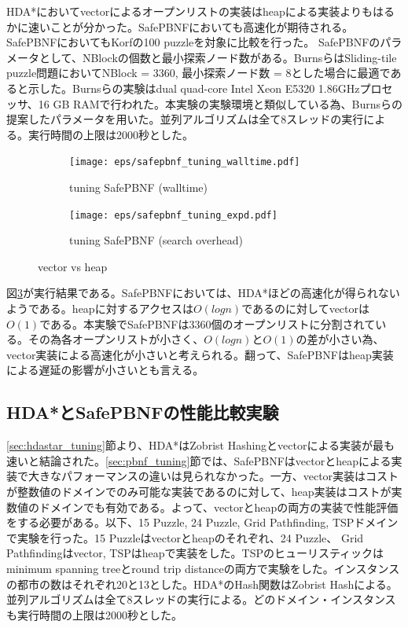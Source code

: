 \documentclass{jsarticle}
\begin{document}
HDA*においてvectorによるオープンリストの実装はheapによる実装よりもはるかに速いことが分かった。SafePBNFにおいても高速化が期待される。SafePBNFにおいてもKorfの100 puzzleを対象に比較を行った。
SafePBNFのパラメータとして、NBlockの個数と最小探索ノード数がある。BurnsらはSliding-tile puzzle問題においてNBlock = 3360, 最小探索ノード数 = 8とした場合に最適であると示した。Burnsらの実験はdual quad-core Intel Xeon E5320 1.86GHzプロセッサ、16 GB RAMで行われた。本実験の実験環境と類似している為、Burnsらの提案したパラメータを用いた。並列アルゴリズムは全て8スレッドの実行による。実行時間の上限は2000秒とした。


\begin{figure}
	\centering
	\begin{subfigure}{0.4\columnwidth}
		\texttt{[image: eps/safepbnf\_tuning\_walltime.pdf]}
		\caption{tuning SafePBNF (walltime)}
		\label{fig:safepbnf_tuning_walltime}
	\end{subfigure}
	\begin{subfigure}{0.4\columnwidth}
		\texttt{[image: eps/safepbnf\_tuning\_expd.pdf]}
		\caption{tuning SafePBNF (search overhead)}
		\label{fig:safepbnf_tuning_expd}
	\end{subfigure}
	\label{fig:safepbnf_tuning}
	\caption{vector vs heap}
\end{figure}

図\ref{fig:safepbnf_tuning}が実行結果である。SafePBNFにおいては、HDA*ほどの高速化が得られないようである。heapに対するアクセスは$O(logn)$であるのに対してvectorは$O(1)$である。本実験でSafePBNFは3360個のオープンリストに分割されている。その為各オープンリストが小さく、$O(logn)$と$O(1)$の差が小さい為、vector実装による高速化が小さいと考えられる。翻って、SafePBNFはheap実装による遅延の影響が小さいとも言える。

\subsection{HDA*とSafePBNFの性能比較実験}

\ref{sec:hdastar_tuning}節より、HDA*はZobrist Hashingとvectorによる実装が最も速いと結論された。\ref{sec:pbnf_tuning}節では、SafePBNFはvectorとheapによる実装で大きなパフォーマンスの違いは見られなかった。一方、vector実装はコストが整数値のドメインでのみ可能な実装であるのに対して、heap実装はコストが実数値のドメインでも有効である。よって、vectorとheapの両方の実装で性能評価をする必要がある。以下、15 Puzzle, 24 Puzzle, Grid Pathfinding, TSPドメインで実験を行った。15 Puzzleはvectorとheapのそれぞれ、24 Puzzle、 Grid Pathfindingはvector, TSPはheapで実装をした。TSPのヒューリスティックはminimum spanning treeとround trip distanceの両方で実験をした。インスタンスの都市の数はそれぞれ20と13とした。HDA*のHash関数はZobrist Hashによる。並列アルゴリズムは全て8スレッドの実行による。どのドメイン・インスタンスも実行時間の上限は2000秒とした。
\end{document}
